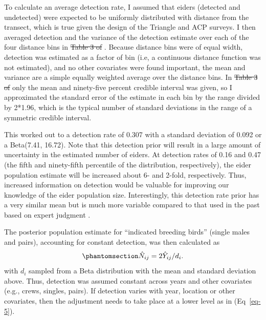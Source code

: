 \documentclass[
  10pt,
  letterpaper,
]{article}
\makeatletter
\providecommand{\DIFdeltex}[1]{{\protect\color{red}\sout{#1}}} %
\providecommand{\DIFdelbegin}{} %
\providecommand{\DIFdelend}{} %
\providecommand{\DIFdel}[1]{\texorpdfstring{\DIFdeltex{#1}}{}} %
\providecommand{\DIFscaledelfig}{0.5}
\newlength{\DIFdelgraphicswidth} %
\newlength{\DIFdelgraphicsheight} %
\providecommand{\DIFdelincludegraphics}[2][]{%
\sbox{\DIFdelgraphicsbox}{\DIFOincludegraphics[#1]{#2}}%
\settoboxwidth{\DIFdelgraphicswidth}{\DIFdelgraphicsbox} %
\settoboxtotalheight{\DIFdelgraphicsheight}{\DIFdelgraphicsbox} %
\scalebox{\DIFscaledelfig}{%
\parbox[b]{\DIFdelgraphicswidth}{\usebox{\DIFdelgraphicsbox}\\[-\baselineskip] \rule{\DIFdelgraphicswidth}{0em}}\llap{\resizebox{\DIFdelgraphicswidth}{\DIFdelgraphicsheight}{%
\setlength{\unitlength}{\DIFdelgraphicswidth}%
\begin{picture}(1,1)%
\thicklines\linethickness{2pt} %
{\color[rgb]{1,0,0}\put(0,0){\framebox(1,1){}}}%
{\color[rgb]{1,0,0}\put(0,0){\line( 1,1){1}}}%
{\color[rgb]{1,0,0}\put(0,1){\line(1,-1){1}}}%
\end{picture}%
}\hspace*{3pt}}} %
} %
\DeclareRobustCommand{\DIFdelbegin}{\DIFOdelbegin \let\includegraphics\DIFdelincludegraphics} %
\DeclareRobustCommand{\DIFdelend}{\DIFOaddend \let\includegraphics\DIFOincludegraphics} %
\let\sout@orig\sout %
\renewcommand{\sout}[1]{\ifmmode\text{\sout@orig{\ensuremath{#1}}}\else\sout@orig{#1}\fi} %
\makeatother
\begin{document}
To calculate an average detection rate, I assumed that eiders (detected
and undetected) were expected to be uniformly distributed with distance
from the transect, which is true given the design of the Triangle and
ACP surveys. I then averaged detection and the variance of the detection
estimate over each of the four distance bins in \DIFdelbegin \DIFdel{Table 3 of
}\DIFdelend {}. Because distance bins were of equal width, detection was estimated as a factor of bin (i.e, a continuous distance function was not estimated), and no other covariates were found important, the mean and variance are a simple equally weighted average over the distance bins. In \DIFdelbegin \DIFdel{Table 3 of }\DIFdelend {} only the mean and ninety-five percent credible interval was given, so I approximated the standard error of the estimate in each bin by the range divided by 2*1.96, which is the typical number of standard deviations in the range of a symmetric credible interval.

This worked out to a detection rate of 0.307 with a standard deviation
of 0.092 or a Beta(7.41, 16.72). Note that this detection prior will
result in a large amount of uncertainty in the estimated number of
eiders. At detection rates of 0.16 and 0.47 (the fifth and ninety-fifth
percentile of the distribution, respectively), the eider population
estimate will be increased about 6- and 2-fold, respectively. Thus,
increased information on detection would be valuable for improving our
knowledge of the eider population size. Interestingly, this detection
rate prior has a very similar mean but is much more variable compared to
that used in the past based on expert judgment
\citep{dunham2017evaluating}.

The posterior population estimate for ``indicated breeding birds''
(single males and pairs), accounting for constant detection, was then
calculated as
\begin{equation}\phantomsection\label{eq-7}{\hat N_{ij} = 2\hat Y _{ij}/d_{i}.}\end{equation}
with \(d_i\) sampled from a Beta distribution with the mean and standard
deviation above. Thus, detection was assumed constant across years and
other covariates (e.g., crews, singles, pairs). If detection varies with
year, location or other covariates, then the adjustment needs to take
place at a lower level as in (Eq~\ref{eq-5}).
\end{document}
